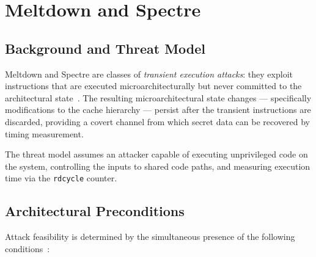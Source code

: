 \section{Meltdown and Spectre}
\label{sec:meltdown_spectre}

\subsection{Background and Threat Model}

Meltdown and Spectre are classes of \emph{transient execution attacks}: they
exploit instructions that are executed microarchitecturally but never committed
to the architectural state~\cite{lipp2018meltdown,kocher2019spectre}.  The
resulting microarchitectural state changes — specifically modifications to the
cache hierarchy — persist after the transient instructions are discarded,
providing a covert channel from which secret data can be recovered by timing
measurement.

The threat model assumes an attacker capable of executing unprivileged code on
the system, controlling the inputs to shared code paths, and measuring execution
time via the \texttt{rdcycle} counter.

\subsection{Architectural Preconditions}
\label{subsec:preconditions}

Attack feasibility is determined by the simultaneous presence of the following
conditions~\cite{kocher2019spectre,intel2018analysis,arm2018cache}:

